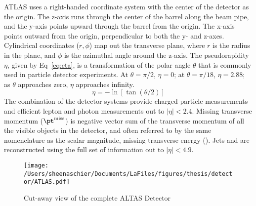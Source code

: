 ATLAS uses a right-handed coordinate system with the center of the detector as the origin.  The z-axis runs through the center of the barrel along the beam pipe, and the y-axis points upward through the barrel from the origin.  The x-axis points outward from the origin, perpendicular to both the y- and z-axes.  Cylindrical coordinates ($r,\phi$) map out the transverse plane, where $r$ is the radius in the plane, and $\phi$ is the azimuthal angle around the z-axis.  The pseudorapidity $\eta$, given by Eq~\ref{eq:eta}, is a transformation of the polar angle $\theta$ that is commonly used in particle detector experiments.  At $\theta=\pi/2$, $\eta=0$; at $\theta=\pi/18$, $\eta=2.88$; as $\theta$ approaches zero, $\eta$ approaches infinity.
\begin{equation}
\eta=-\ln[\tan(\theta/2)]
\label{eq:eta}
\end{equation}
The combination of the detector systems provide charged particle measurements and efficient lepton and photon measurements out to $|\eta| < 2.4$.  Missing transverse momentum ($\pt^{\mathrm{miss}}$) is negative vector sum of the transverse momentum of all the visible objects in the detector, and often referred to by the same nomenclature as the scalar magnitude, missing transverse energy (\met{}). Jets and \met{} are reconstructed using the full set of information out to $|\eta| < 4.9$.    \begin{figure}[tbp]
  \centering
 \texttt{[image: /Users/sheenaschier/Documents/LaFiles/figures/thesis/detector/ATLAS.pdf]}
    \caption{Cut-away view of the complete ALTAS Detector}
   \label{fig:ATLAS}
 \end{figure}
